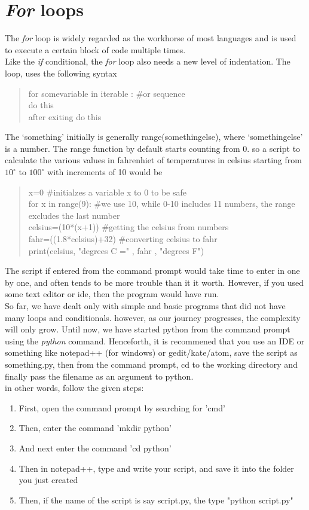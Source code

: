 \section{\emph{For} loops}
The \emph{for} loop is widely regarded as the workhorse of most languages and is used to execute a certain block of code multiple times.\\
Like the \emph{if} conditional, the \emph{for} loop also needs a new level of indentation. The loop, uses the following syntax
\begin{quote}
for somevariable in iterable : \#or sequence\\
\tab do this\\
after exiting do this
\end{quote}
The `something' initially is generally range(somethingelse), where `somethingelse' is a number. The range function by default starts counting from 0.
so a script to calculate the various values in fahrenhiet of temperatures in celsius starting from $10^\circ$ to $100^\circ$ with increments of 10 would be
\begin{quote}
x=0 \tab \#initialzes a variable x to 0 to be safe\\
for x in range(9): \tab \#we use 10, while 0-10 includes 11 numbers, the range excludes the last number\\
\tab celsius=(10*(x+1)) \tab \#getting the celsius from numbers\\
\tab fahr=((1.8*celsius)+32) \tab \#converting celsius to fahr\\
\tab print(celsius, "degrees C =" , fahr , "degrees F")
\end{quote}
The script if entered from the command prompt would take time to enter in one by one, and often tends to be more trouble than it it worth. However, if you used some text editor or ide, then the program would have run.\\
So far, we have dealt only with simple and basic programs that did not have many loops and conditionals. however, as our journey progresses, the complexity will only grow. Until now, we have started python from the command prompt using the \emph{python} command. Henceforth, it is recommened that you use an IDE or something like notepad++ (for windows) or gedit/kate/atom, save the script as something.py, then from the command prompt, cd to the working directory and finally pass the filename as an argument to python.\\ 
in other words, follow the given steps:
\begin{enumerate}
\item First, open the command prompt by searching for 'cmd'
\item  Then, enter the command 'mkdir python'
\item And next enter the command 'cd python'
\item Then in notepad++, type and write your script, and save it into the folder you just created
\item Then, if the name of the script is say script.py, the type "python script.py"
\end{enumerate}
\newpage
